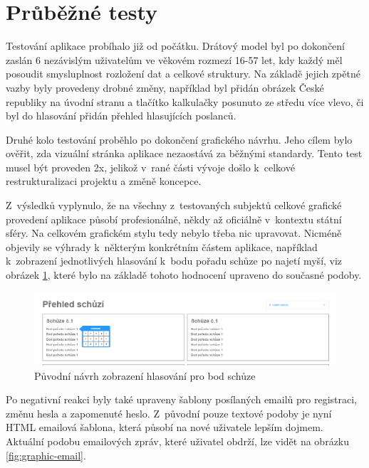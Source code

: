 \section{Průběžné testy}
Testování aplikace probíhalo již od počátku. Drátový model byl po dokončení zaslán 6 nezávislým uživatelům ve věkovém rozmezí 16-57 let, kdy každý měl posoudit smysluplnost rozložení dat a celkové struktury. Na základě jejich zpětné vazby byly provedeny drobné změny, například byl přidán obrázek České republiky na úvodní stranu a tlačítko kalkulačky posunuto ze středu více vlevo, či byl do hlasování přidán přehled hlasujících poslanců.

\par Druhé kolo testování proběhlo po dokončení grafického návrhu. Jeho cílem bylo ověřit, zda vizuální stránka aplikace nezaostává za běžnými standardy. Tento test musel být proveden 2x, jelikož v~rané části vývoje došlo k~celkové restrukturalizaci projektu a změně koncepce.
\par Z~výsledků vyplynulo, že na všechny z~testovaných subjektů celkové grafické provedení aplikace působí profesionálně, někdy až oficiálně v~kontextu státní sféry. Na celkovém grafickém stylu tedy nebylo třeba nic upravovat. Nicméně objevily se výhrady k~některým konkrétním částem aplikace, například k~zobrazení jednotlivých hlasování k~bodu pořadu schůze po najetí myší, viz obrázek \ref{fig:wireframe-schuze-hover}, které bylo na základě tohoto hodnocení upraveno do současné podoby.

\begin{figure}
    \centering
    \includegraphics[width=1\textwidth]{obrazky-figures/wireframe-schuze-hover.png}
    \caption{Původní návrh zobrazení hlasování pro bod schůze}
    \label{fig:wireframe-schuze-hover}
\end{figure}


\par Po negativní reakci byly také upraveny šablony posílaných emailů pro registraci, změnu hesla a zapomenuté heslo. Z~původní pouze textové podoby je nyní HTML emailová šablona, která působí na nové uživatele lepším dojmem. Aktuální podobu emailových zpráv, které uživatel obdrží, lze vidět na obrázku \ref{fig:graphic-email}.

